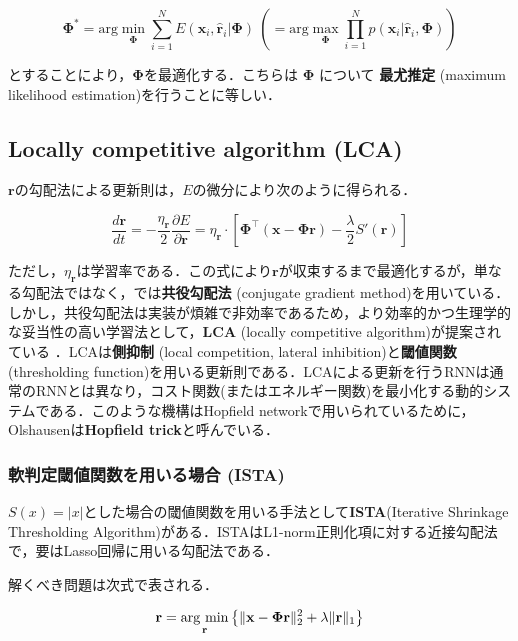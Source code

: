 \begin{equation}
\mathbf{\Phi}^*=\text{arg}\min_{\mathbf{\Phi}} \sum_{i=1}^N E(\mathbf{x}_i, \hat{\mathbf{r}}_i|\mathbf{\Phi})\ \left(= \text{arg}\max_{\mathbf{\Phi}} \prod_{i=1}^N p(\mathbf{x}_i|\hat{\mathbf{r}}_i, \mathbf{\Phi})\right)
\end{equation}


とすることにより，$\mathbf{\Phi}$を最適化する．こちらは $\mathbf{\Phi}$ について \textbf{最尤推定} (maximum likelihood estimation)を行うことに等しい．
\subsection{ Locally competitive algorithm (LCA) }
$\mathbf{r}$の勾配法による更新則は，$E$の微分により次のように得られる．


\begin{equation}
\frac{d \mathbf{r}}{dt}= -\frac{\eta_\mathbf{r}}{2}\frac{\partial E}{\partial \mathbf{r}}=\eta_\mathbf{r} \cdot\left[\mathbf{\Phi}^\top (\mathbf{x}-\mathbf{\Phi}\mathbf{r})- \frac{\lambda}{2}S'\left(\mathbf{r}\right)\right]
\end{equation}


ただし，$\eta_{\mathbf{r}}$は学習率である．この式により$\mathbf{r}$が収束するまで最適化するが，単なる勾配法ではなく，\cite{Olshausen1996-xe}では\textbf{共役勾配法} (conjugate gradient method)を用いている．しかし，共役勾配法は実装が煩雑で非効率であるため，より効率的かつ生理学的な妥当性の高い学習法として，\textbf{LCA}  (locally competitive algorithm)が提案されている \cite{Rozell2008-wp}．LCAは\textbf{側抑制} (local competition, lateral inhibition)と\textbf{閾値関数} (thresholding function)を用いる更新則である．LCAによる更新を行うRNNは通常のRNNとは異なり，コスト関数(またはエネルギー関数)を最小化する動的システムである．このような機構はHopfield networkで用いられているために，Olshausenは\textbf{Hopfield trick}と呼んでいる．
\subsubsection{軟判定閾値関数を用いる場合 (ISTA)}
$S(x)=|x|$とした場合の閾値関数を用いる手法として\textbf{ISTA}(Iterative Shrinkage Thresholding Algorithm)がある．ISTAはL1-norm正則化項に対する近接勾配法で，要はLasso回帰に用いる勾配法である．

解くべき問題は次式で表される．


\begin{equation}
\mathbf{r} = \mathop{\rm arg~min}\limits_{\mathbf{r}}\left\{\|\mathbf{x}-\mathbf{\Phi}\mathbf{r}\|^2_2+\lambda\|\mathbf{r}\|_1\right\}
\end{equation}



